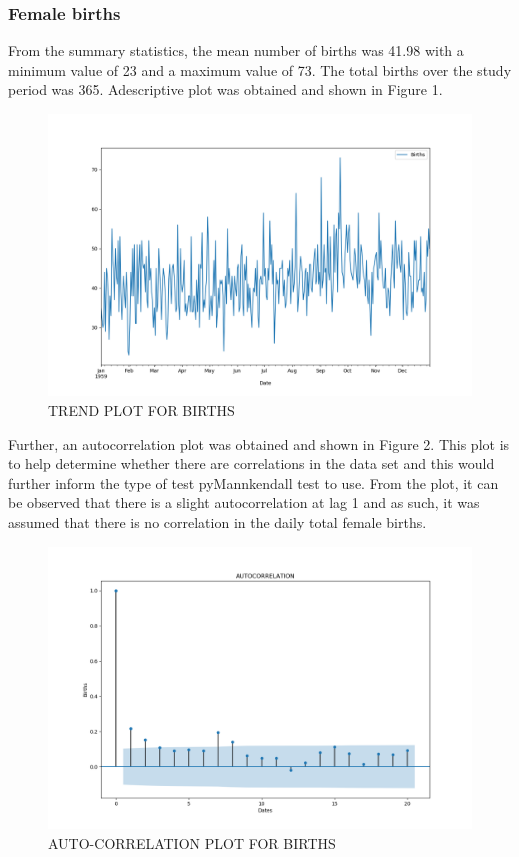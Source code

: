 \documentclass[12pt, letterpaper, twoside]{article}
\begin{document}
\subsubsection{Female births}
From the summary statistics, the mean number of births was 41.98 with a minimum value of 23 and a maximum value of 73. The total births over the study period was 365. Adescriptive plot was obtained and shown in Figure 1. 
\begin{figure}
	    \centering
		\includegraphics[width=1\textwidth]{Birth_data_Trend_plot.png}
		    \caption{TREND PLOT FOR BIRTHS}
		        \label{fig:1.1}
\end{figure}
Further, an  autocorrelation plot was obtained and shown in Figure 2. This plot is to help determine whether there are correlations in the data set and this would further inform the type of test pyMannkendall test to use. From the plot, it can be observed that there is a slight autocorrelation at lag 1 and as such, it was assumed that there is no correlation in the daily total female births.\\
\begin{figure}[bp!]
	    \centering
	        \includegraphics[width=1\textwidth]{BIRTH_DATA_ACF_PLOT.png}
                    \caption{AUTO-CORRELATION PLOT FOR BIRTHS}
			\label{fig:1.1}                                                                                                                                 \end{figure}
\end{document}
